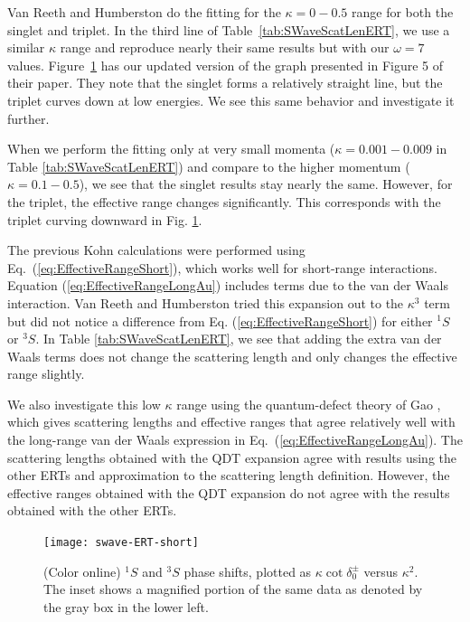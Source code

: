 \documentclass[preprint,showpacs,showkeys,preprintnumbers,amsmath,amssymb,longbibliography,pra,aps]{revtex4-1}
\begin{document}
Van Reeth and Humberston \cite{VanReeth2003} do the fitting for the
$\kappa = 0-0.5$ range for both the singlet and triplet. In the third line of
Table~\ref{tab:SWaveScatLenERT}, we use a similar $\kappa$ range and reproduce
nearly their same results but with our $\omega = 7$ values.
Figure~\ref{fig:swave-ERT-short} has our updated version of the graph
presented in Figure 5 of their paper. They note that the singlet forms a
relatively straight line, but the triplet curves down at low energies. We see
this same behavior and investigate it further.

When we perform the fitting only at very small momenta
($\kappa = 0.001 - 0.009$ in
Table \ref{tab:SWaveScatLenERT}) and compare to the higher momentum
($\kappa = 0.1 - 0.5$), we see that the singlet results stay nearly the same. 
However, for the triplet, the effective range changes significantly. This 
corresponds with the triplet curving downward in
Fig. \ref{fig:swave-ERT-short}.

The previous Kohn calculations \cite{VanReeth2003} were performed using
Eq.~(\ref{eq:EffectiveRangeShort}), which works well for short-range
interactions. Equation (\ref{eq:EffectiveRangeLongAu}) includes terms due
to the van der Waals interaction. Van Reeth and Humberston \cite{VanReeth2003}
tried this expansion out to the $\kappa^3$ term but did not notice a
difference from Eq. (\ref{eq:EffectiveRangeShort}) for either $^1S$ or $^3S$.
In Table \ref{tab:SWaveScatLenERT}, we see that adding the extra van der
Waals terms does not change the scattering length and only changes the
effective range slightly.

We also investigate this low $\kappa$ range using the quantum-defect theory 
of Gao \cite{Gao1998}, which gives scattering lengths and effective ranges
that agree relatively well with the long-range van der Waals expression in
Eq.~(\ref{eq:EffectiveRangeLongAu}). The scattering 
lengths obtained with the QDT expansion agree with results using the other 
ERTs and approximation to the scattering length definition. However, the 
effective ranges obtained with the QDT expansion do not agree with the 
results obtained with the other ERTs.


\begin{figure}[H]
	\centering
	\texttt{[image: swave-ERT-short]}
	\caption{(Color online) $^1S$ and $^3S$ phase shifts, plotted as
$\kappa \cot \delta_0^\pm$ versus $\kappa^2$. The inset shows a magnified
portion of the same data as denoted by the gray box in the lower left.}
	\label{fig:swave-ERT-short}
\end{figure}
\end{document}
